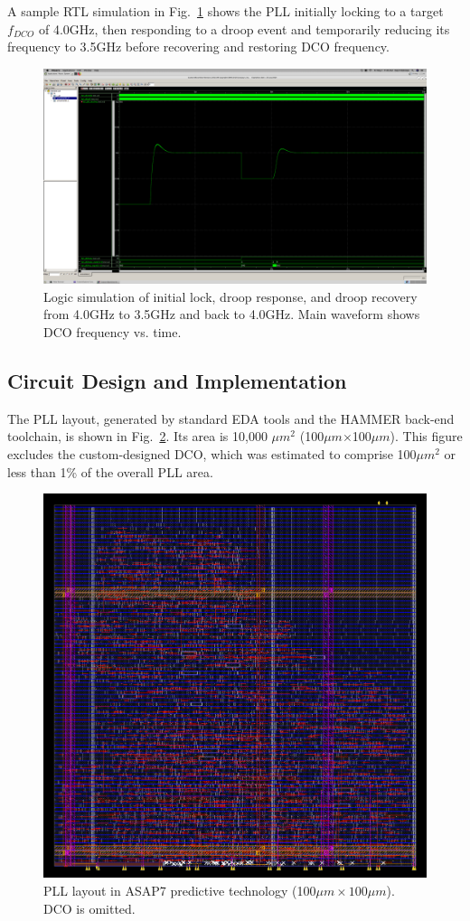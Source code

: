 \documentclass[twoside,9pt,journal,letterpage]{IEEEtran}
\begin{document}
A sample RTL simulation in Fig.\ \ref{fig:brake} shows the PLL initially locking to a target $f_{DCO}$ of 4.0GHz, then responding to a droop event and temporarily reducing its frequency to 3.5GHz before recovering and restoring DCO frequency.

\begin{figure}[h]
	\centering
	\includegraphics[width=\columnwidth]{brake1.png}
	\caption{Logic simulation of initial lock, droop response, and droop recovery from 4.0GHz to 3.5GHz and back to 4.0GHz. Main waveform shows DCO frequency vs. time.}
	\label{fig:brake}
\end{figure}

\vspace{-7pt}
\subsection{Circuit Design and Implementation}
\label{sec:circuit_design}

The PLL layout, generated by standard EDA tools and the HAMMER \cite{wanghammer} back-end toolchain, is shown in Fig.\ \ref{fig:layout}. Its area is 10,000 $\mu m^2$ (100$\mu m$$\times$100$\mu m$). This figure excludes the custom-designed DCO, which was estimated to comprise 100$\mu m^2$ or less than 1\% of the overall PLL area.

\begin{figure}[h]
	\centering
	\includegraphics[width=0.7\columnwidth]{pnr3.png}
	\caption{PLL layout in ASAP7 predictive technology (100$\mu m\times100\mu m$). DCO is omitted.}
	\label{fig:layout}
\end{figure}
\end{document}
